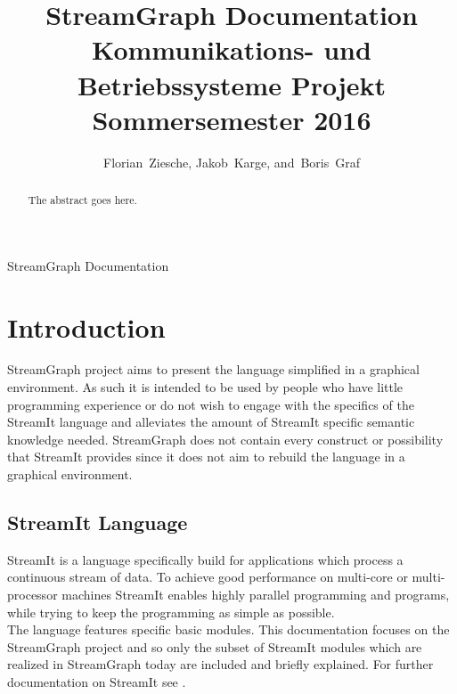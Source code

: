 \documentclass[journal]{IEEEtran}
\begin{document}
\title{StreamGraph Documentation\\ Kommunikations- und Betriebssysteme Projekt Sommersemester 2016}
\author{Florian~Ziesche, Jakob~Karge, and~Boris~Graf}

%
{StreamGraph Documentation}


\maketitle

\begin{abstract}
The abstract goes here.
\end{abstract}


\section{Introduction}
 StreamGraph project aims to present the language
simplified in a graphical environment. As such it is intended to be used by
people who have little programming experience or do not wish to engage with the
specifics of the StreamIt language and alleviates the amount of StreamIt
specific semantic knowledge needed. StreamGraph does not contain every construct
or possibility that StreamIt provides since it does not aim to rebuild the
language in a graphical environment.



\subsection{StreamIt Language}
\noindent StreamIt is a language specifically build for applications which
process a continuous stream of data. To achieve good performance on multi-core
or multi-processor machines StreamIt enables highly parallel programming and
programs, while trying to keep the programming as simple as possible.\\

The language features specific basic modules. This documentation focuses on the
StreamGraph project and so only the subset of StreamIt modules which are
realized in StreamGraph today are included and briefly explained. For further
documentation on StreamIt see \cite{streamIt}.\\
\end{document}
